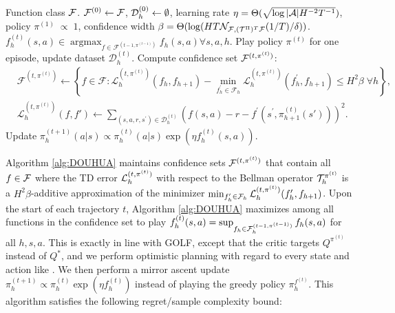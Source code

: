 \begin{algorithm}[t]
    \caption{}
    \begin{algorithmic}[1]
             Function class ${\mathcal{F}}$.
             ${\mathcal{F}}^{(0)} \leftarrow {\mathcal{F}}$, ${\mathcal{D}}_h^{(0)}\leftarrow \emptyset$, learning rate $\eta = \Theta(\sqrt{\log|{\mathcal{A}}| H^{-2}T^{-1}})$, policy $\pi^{(1)} \; \propto \; 1$, confidence width $\beta=\Theta(\log (HT \mathcal{N}_{{\mathcal{F}}, ({\mathcal{T}}^{\Pi})^T {\mathcal{F}}}(1/T) / \delta))$.
            \STATE $f_h^{(t)}(s,a) \in \operatorname{argmax}_{f \in \mathcal{F}^{(t-1, \pi^{(t-1)})}} f_h\left(s,a\right) \forall s,a,h$.
            \STATE Play policy $\pi^{(t)}$ for one episode, update dataset $\mathcal{D}_h^{(t)}$. 
            \STATE Compute confidence set ${\mathcal{F}}^{(t,\pi^{(t)})}$:
            \begingroup
            \addtolength\jot{-1ex}
            \begin{align*}
                &\mathcal{F}^{(t, \pi^{(t)})} \leftarrow\left\{f \in \mathcal{F}: \mathcal{L}_h^{(t, \pi^{(t)})}\left(f_h, f_{h+1}\right)-\min _{f_h^{\prime} \in \mathcal{F}_h} \mathcal{L}_h^{(t, \pi^{(t)})}\left(f_h^{\prime}, f_{h+1}\right) \leq H^2\beta \; \forall h\right\},\\
                &\mathcal{L}_h^{(t, \pi^{(t)})}\left(f, f'\right) \gets\sum_{\left(s, a, r, s^{\prime}\right) \in \mathcal{D}_h^{(t)}}\left(f(s, a)-r-f^{\prime}(s^{\prime}, \pi^{(t)}_{h+1}(s'))\right)^2.
            \end{align*}
            \endgroup
        \STATE Update $\pi_h^{(t+1)}(a|s) \propto \pi_h^{(t)}(a|s)\exp(\eta f_h^{(t)}(s,a))$.
        \ENDFOR
    \end{algorithmic}
\label{alg:DOUHUA}
\end{algorithm}

Algorithm \ref{alg:DOUHUA} maintains confidence sets ${\mathcal{F}}^{(t, \pi^{(t)})}$ that contain all $f \in {\mathcal{F}}$ where the TD error ${\mathcal{L}}_h^{(t,\pi^{(t)})}$ with respect to the Bellman operator ${\mathcal{T}}_h^{\pi^{(t)}}$ is a $H^2\beta$-additive approximation of the minimizer $\min_{f_h' \in {\mathcal{F}}_h} {\mathcal{L}}_h^{(t,\pi^{(t)})}(f_h',f_{h+1})$. Upon the start of each trajectory $t$, Algorithm \ref{alg:DOUHUA} maximizes among all functions in the confidence set to play 
$f_h^{(t)}(s,a) = \sup_{f_h \in {\mathcal{F}}_h^{(t-1,\pi^{(t-1)})}} f_h(s,a)$ for all $h, s,a$. This is exactly in line with GOLF, except that the critic targets $Q^{\pi^{(t)}}$ instead of $Q^*$, and we perform optimistic planning with regard to every state and action like \citet{liu2023optimistic}. We then perform a mirror ascent update $\pi_h^{(t+1)} \propto \pi_h^{(t)}\exp(\eta f_h^{(t)})$ instead of playing the greedy policy $\pi_h^{f^{(t)}}$. This algorithm satisfies the following  regret/sample complexity bound: 

